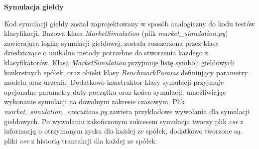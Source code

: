 \documentclass[a4paper, twoside, 11pt, openright]{article}
\begin{document}
\bigskip

\textbf{Symulacja giełdy}

Kod symulacji giełdy został zaprojektowany w sposób analogiczny do kodu testów klasyfikacji. Bazowa klasa \textit{MarketSimulation} (plik \textit{market\_simulation.py}) zawierająca logikę symulacji giełdowej, została rozszerzona przez klasy dziedziczące o unikalne metody potrzebne do stworzenia każdego z klasyfikatorów. Klasa \textit{MarketSimulation} przyjmuje listę symboli giełdowych konkretnych spółek, oraz obiekt klasy \textit{BenchmarkParams} definiujący parametry modelu oraz uczenia. Dodatkowo konstruktor klasy symulacji przyjmuje opcjonalne parametry daty początku oraz końca symulacji, umożliwiając wykonanie symulacji na dowolnym zakresie czasowym. Plik \textit{market\_simulation\_executions.py} zawiera przykładowe wywołania dla symulacji giełdowych. Po wywołaniu zakończonym sukcesem symulacja tworzy plik \textit{csv} z informacją o otrzymanym zysku dla każdej ze spółek, dodatkowo tworzone są pliki \textit{csv} z historią transakcji dla każdej ze spółek.
\end{document}
